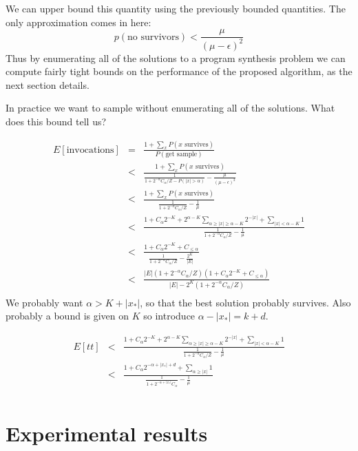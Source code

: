 \documentclass{article}
\begin{document}
We can upper bound this quantity using the previously bounded quantities.
The only approximation comes in here:
\begin{equation}
  p(\text{no survivors}) < \frac{\mu}{(\mu - \epsilon)^2}
\end{equation}
Thus by enumerating all of the solutions to a program synthesis problem we can compute fairly tight bounds on the performance of the proposed algorithm,
as the next section details.

In practice we want to sample without enumerating all of the solutions.
What does this bound tell us?

\begin{eqnarray}
  E[\text{invocations}]& =&   \frac{1 + \sum_x P(x \text{ survives})}{P(\text{get sample})}\\
  &<& \frac{1 + \sum_x P(x \text{ survives})}{\frac{1}{1 + 2^{-\alpha}C_\alpha/Z - P(|x|>\alpha)} - \frac{\mu}{(\mu - \epsilon)^2}}\\
  &<& \frac{1 + \sum_x P(x \text{ survives})}{\frac{1}{1 + 2^{-\alpha}C_\alpha/Z} - \frac{1}{\mu}}\\
  &<& \frac{1 + C_\alpha 2^{-K} + 2^{\alpha-K}\sum_{\alpha\geq |x|\geq \alpha-K}2^{-|x|} + \sum_{|x|<\alpha-K} 1}{\frac{1}{1 + 2^{-\alpha}C_\alpha/Z} - \frac{1}{\mu}}\\
  &<& \frac{1 + C_\alpha 2^{-K} + C_{\leq\alpha}}{\frac{1}{1 + 2^{-\alpha}C_\alpha/Z} - \frac{2^{K}}{|E|}}\\
  &<& \frac{|E|(1 + 2^{-\alpha}C_\alpha/Z)(1 + C_\alpha 2^{-K} + C_{\leq\alpha})}{|E| - 2^K(1 + 2^{-\alpha}C_\alpha/Z)}\\
\end{eqnarray}
We probably want $\alpha>K + |x_*|$, so that the best solution probably survives.
Also probably a bound is given on $K$
so introduce $\alpha - |x_*| = k+d$.

\begin{eqnarray}
  E[tt]& < &\frac{1 + C_\alpha 2^{-K} + 2^{\alpha-K}\sum_{\alpha\geq |x|\geq \alpha-K}2^{-|x|} + \sum_{|x|<\alpha-K} 1}{\frac{1}{1 + 2^{-\alpha}C_\alpha/Z} - \frac{1}{\mu}}\\
  & < &\frac{1 + C_\alpha 2^{-\alpha + |x_*| + d} + \sum_{\alpha\geq |x|}1}{\frac{1}{1 + 2^{-\alpha+|x_*|}C_\alpha} - \frac{1}{\mu}}\\
\end{eqnarray}



\section{Experimental results}
\end{document}
